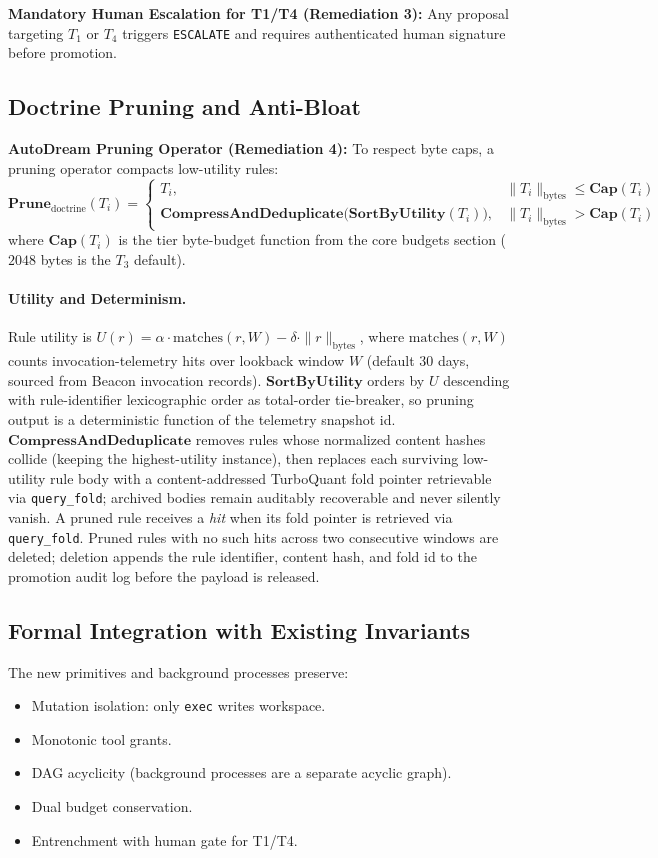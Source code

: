 \documentclass[11pt]{article}
\begin{document}
\textbf{Mandatory Human Escalation for T1/T4 (Remediation 3):} Any proposal targeting $T_1$ or $T_4$ triggers \texttt{ESCALATE} and requires authenticated human signature before promotion.

\subsection{Doctrine Pruning and Anti-Bloat}
\textbf{AutoDream Pruning Operator (Remediation 4):} To respect byte caps, a pruning operator compacts low-utility rules:
\[
\mathbf{Prune}_{\text{doctrine}}(T_i) =
\begin{cases}
T_i, & \|T_i\|_{\text{bytes}} \le \mathbf{Cap}(T_i) \\
\mathbf{CompressAndDeduplicate}\big(\mathbf{SortByUtility}(T_i)\big), & \|T_i\|_{\text{bytes}} > \mathbf{Cap}(T_i)
\end{cases}
\]
where $\mathbf{Cap}(T_i)$ is the tier byte-budget function from the core
budgets section ($2048$ bytes is the $T_3$ default).

\paragraph{Utility and Determinism.}
Rule utility is $U(r) = \alpha \cdot \mathrm{matches}(r, W) -
\delta \cdot \|r\|_{\text{bytes}}$, where $\mathrm{matches}(r, W)$ counts
invocation-telemetry hits over lookback window $W$ (default $30$ days,
sourced from Beacon invocation records). $\mathbf{SortByUtility}$ orders by
$U$ descending with rule-identifier lexicographic order as total-order
tie-breaker, so pruning output is a deterministic function of the telemetry
snapshot id. $\mathbf{CompressAndDeduplicate}$ removes rules whose
normalized content hashes collide (keeping the highest-utility instance),
then replaces each surviving low-utility rule body with a content-addressed
TurboQuant fold pointer retrievable via \texttt{query\_fold}; archived
bodies remain auditably recoverable and never silently vanish. A pruned
rule receives a \emph{hit} when its fold pointer is retrieved via
\texttt{query\_fold}. Pruned rules with no such hits across two consecutive
windows are deleted; deletion appends the rule identifier, content hash,
and fold id to the promotion audit log before the payload is released.

\subsection{Formal Integration with Existing Invariants}
The new primitives and background processes preserve:
\begin{itemize}
    \item Mutation isolation: only \texttt{exec} writes workspace.
    \item Monotonic tool grants.
    \item DAG acyclicity (background processes are a separate acyclic graph).
    \item Dual budget conservation.
    \item Entrenchment with human gate for T1/T4.
\end{itemize}
\end{document}
